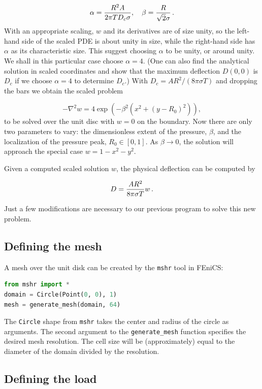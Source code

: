 \documentclass[graybox,envcountchap,sectrefs,final]{svmonodo}
\begin{document}
\[ \alpha = \frac{R^2A}{2\pi T D_c\sigma},\quad\beta = \frac{R}{\sqrt{2}\sigma}\tp\]
With an appropriate scaling, $w$ and its derivatives are of size
unity, so the left-hand side of the scaled PDE is about unity in size,
while the right-hand side has $\alpha$ as its characteristic size.
This suggest choosing $\alpha$ to be unity, or around unity. We shall
in this particular case choose $\alpha=4$. (One can also find the
analytical solution in scaled coordinates and show that the maximum
deflection $D(0,0)$ is $D_c$ if we choose $\alpha=4$ to determine
$D_c$.) With $D_c=AR^2/(8\pi\sigma T)$ and dropping the bars we obtain
the scaled problem

\begin{equation}
-\nabla^2w = 4\exp{\left(
- \beta^2(x^2
+ (y-R_0)^2)\right)},
\label{ch:poisson0:membrane:scaled:eq}
\end{equation}
to be solved over the unit disc with $w=0$ on the boundary. Now
there are only two parameters to vary: the dimensionless extent of the
pressure, $\beta$, and the localization of the pressure peak, $R_0\in
[0,1]$.  As $\beta\rightarrow 0$, the solution will approach the
special case $w=1-x^2-y^2$.

Given a computed scaled solution $w$, the physical deflection can be computed by

\[ D = \frac{AR^2}{8\pi\sigma T}w\tp\]

Just a few modifications are necessary to our previous program to solve
this new problem.

\subsection{Defining the mesh}

A mesh over the unit disk can be created by the \texttt{mshr} tool in
FEniCS:

\begin{lstlisting}[language=Python,style=graycolor]
from mshr import *
domain = Circle(Point(0, 0), 1)
mesh = generate_mesh(domain, 64)
\end{lstlisting}
The \texttt{Circle} shape from \texttt{mshr} takes the center and radius of the
circle as arguments. The second argument to the \Verb!generate_mesh!
function specifies the desired mesh resolution. The cell size will be
(approximately) equal to the diameter of the domain divided by the
resolution.

\subsection{Defining the load}
\end{document}
